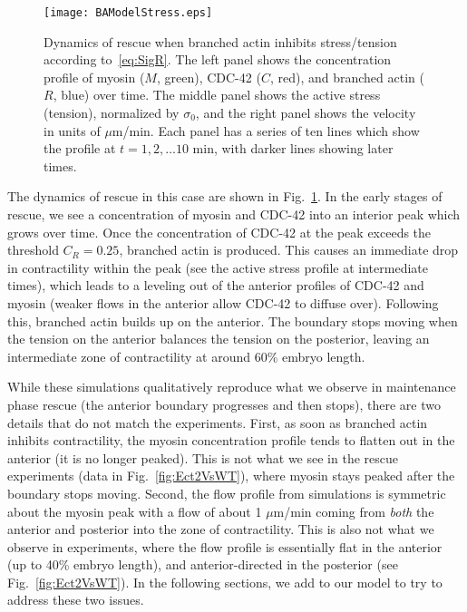\documentclass[11pt]{article}
\newcommand{\6}[1]{#1_{\text{6}}}
\newcommand{\3}[1]{#1_{\text{3}}}
\begin{document}
\begin{figure}
\centering
\texttt{[image: BAModelStress.eps]}
\caption{\label{fig:BAInStr} Dynamics of rescue when branched actin inhibits stress/tension according to\ \eqref{eq:SigR}. The left panel shows the concentration profile of myosin ($M$, green), CDC-42 ($C$, red), and branched actin ($R$, blue) over time. The middle panel shows the active stress (tension), normalized by $\sigma_0$, and the right panel shows the velocity in units of $\mu$m/min. Each panel has a series of ten lines which show the profile at $t=1, 2, \dots 10$ min, with darker lines showing later times.}
\end{figure}

The dynamics of rescue in this case are shown in Fig.\ \ref{fig:BAInStr}. In the early stages of rescue, we see a concentration of myosin and CDC-42 into an interior peak which grows over time. Once the concentration of CDC-42 at the peak exceeds the threshold $C_R=0.25$, branched actin is produced. This causes an immediate drop in contractility within the peak (see the active stress profile at intermediate times), which leads to a leveling out of the anterior profiles of CDC-42 and myosin (weaker flows in the anterior allow CDC-42 to diffuse over). Following this, branched actin builds up on the anterior. The boundary stops moving when the tension on the anterior balances the tension on the posterior, leaving an intermediate zone of contractility at around 60\% embryo length. 

While these simulations qualitatively reproduce what we observe in maintenance phase rescue (the anterior boundary progresses and then stops), there are two details that do not match the experiments. First, as soon as branched actin inhibits contractility, the myosin concentration profile tends to flatten out in the anterior (it is no longer peaked). This is not what we see in the rescue experiments (data in Fig.\ \ref{fig:Ect2VsWT}), where myosin stays peaked after the boundary stops moving. Second, the flow profile from simulations is symmetric about the myosin peak with a flow of about 1 $\mu$m/min coming from \emph{both} the anterior and posterior into the zone of contractility. This is also not what we observe in experiments, where the flow profile is essentially flat in the anterior (up to 40\% embryo length), and anterior-directed in the posterior (see Fig.\ \ref{fig:Ect2VsWT}). In the following sections, we add to our model to try to address these two issues.
\end{document}
